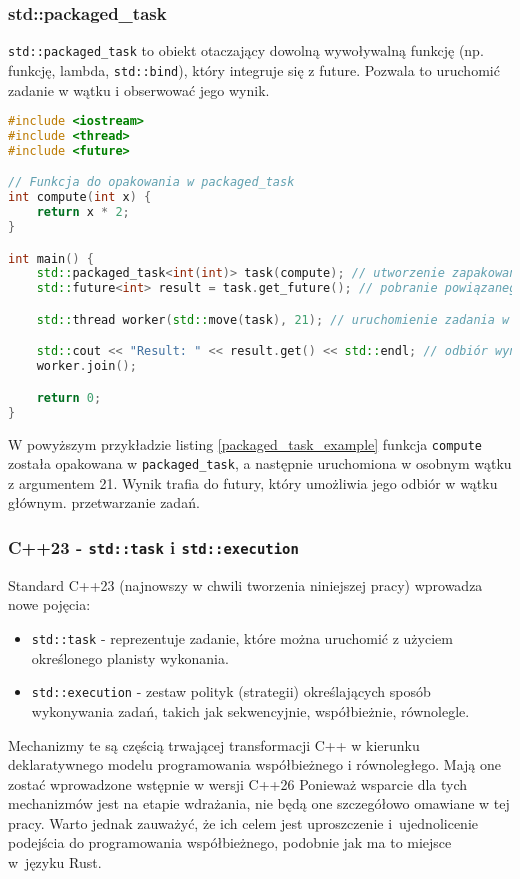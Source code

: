 \subsubsection{std::packaged\_task}
\texttt{std::packaged\_task} to obiekt otaczający dowolną wywoływalną funkcję (np. funkcję, lambda, \texttt{std::bind}), który integruje się z future. Pozwala to uruchomić zadanie w wątku i obserwować jego wynik.
\begin{lstlisting}[language=C++, style=VS2017,  caption={Przykład użycia std::packaged\_task}, label={packaged_task_example}]
#include <iostream>
#include <thread>
#include <future>

// Funkcja do opakowania w packaged_task
int compute(int x) {
    return x * 2;
}

int main() {
    std::packaged_task<int(int)> task(compute); // utworzenie zapakowanego zadania
    std::future<int> result = task.get_future(); // pobranie powiązanego future

    std::thread worker(std::move(task), 21); // uruchomienie zadania w wątku z parametrem 21

    std::cout << "Result: " << result.get() << std::endl; // odbiór wyniku
    worker.join();

    return 0;
}
\end{lstlisting}
W powyższym przykładzie listing \ref{packaged_task_example} funkcja \texttt{compute} została opakowana w \texttt{packaged\_task}, a następnie uruchomiona w osobnym wątku z argumentem 21. Wynik trafia do futury, który umożliwia jego odbiór w wątku głównym. przetwarzanie zadań.

\subsubsection{C++23 - \texttt{std::task} i \texttt{std::execution}}
Standard C++23 (najnowszy w chwili tworzenia niniejszej pracy) wprowadza nowe pojęcia:
\begin{itemize}
    \item \texttt{std::task} - reprezentuje zadanie, które można uruchomić z użyciem określonego planisty wykonania.
    \item \texttt{std::execution} - zestaw polityk (strategii) określających sposób wykonywania zadań, takich jak sekwencyjnie, współbieżnie, równolegle.
\end{itemize}

Mechanizmy te są częścią trwającej transformacji C++ w kierunku deklaratywnego modelu programowania współbieżnego i równoległego. Mają one zostać wprowadzone wstępnie w wersji C++26 \cite{cpp26} Ponieważ wsparcie dla tych mechanizmów jest na etapie wdrażania, nie będą one szczegółowo omawiane w tej pracy. Warto jednak zauważyć, że ich celem jest uproszczenie i~ujednolicenie podejścia do programowania współbieżnego, podobnie jak ma to miejsce w~języku Rust.